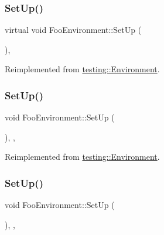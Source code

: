 \subsubsection{\texorpdfstring{SetUp()}{SetUp()}\hspace{0.1cm}{\footnotesize\ttfamily [1/3]}}
{\footnotesize\ttfamily virtual void Foo\+Environment\+::\+Set\+Up (\begin{DoxyParamCaption}{ }\end{DoxyParamCaption})\hspace{0.3cm}{\ttfamily [inline]}, {\ttfamily [virtual]}}



Reimplemented from \mbox{\hyperlink{classtesting_1_1_environment_a1bf8cafaa9d4eba9feb98655ee434eb3}{testing\+::\+Environment}}.

\mbox{\label{class_foo_environment_abf6a0edbb3be025e9f143a7a1b89f9dd}} 
\subsubsection{\texorpdfstring{SetUp()}{SetUp()}\hspace{0.1cm}{\footnotesize\ttfamily [2/3]}}
{\footnotesize\ttfamily void Foo\+Environment\+::\+Set\+Up (\begin{DoxyParamCaption}{ }\end{DoxyParamCaption})\hspace{0.3cm}{\ttfamily [inline]}, {\ttfamily [override]}, {\ttfamily [virtual]}}



Reimplemented from \mbox{\hyperlink{classtesting_1_1_environment_a1bf8cafaa9d4eba9feb98655ee434eb3}{testing\+::\+Environment}}.

\mbox{\label{class_foo_environment_abf6a0edbb3be025e9f143a7a1b89f9dd}} 
\subsubsection{\texorpdfstring{SetUp()}{SetUp()}\hspace{0.1cm}{\footnotesize\ttfamily [3/3]}}
{\footnotesize\ttfamily void Foo\+Environment\+::\+Set\+Up (\begin{DoxyParamCaption}{ }\end{DoxyParamCaption})\hspace{0.3cm}{\ttfamily [inline]}, {\ttfamily [override]}, {\ttfamily [virtual]}}



